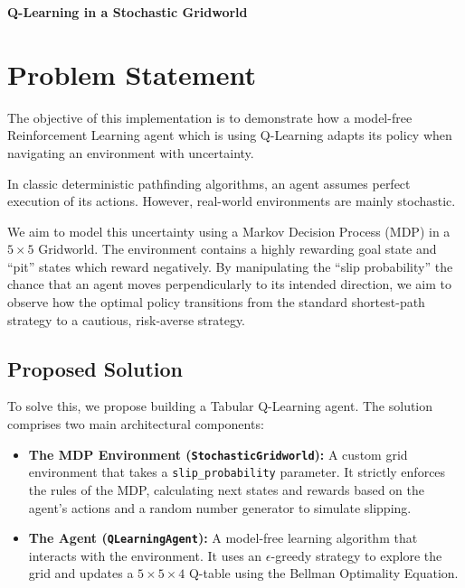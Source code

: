 \begin{center}
    \Large\textbf{\textcolor{primary}{Q-Learning in a Stochastic Gridworld}}
\end{center}
\vspace{0.5cm}

\section{\textcolor{secondary}{Problem Statement}}
The objective of this implementation is to demonstrate how a model-free Reinforcement Learning agent which is using Q-Learning adapts its policy when navigating an environment with uncertainty.

In classic deterministic pathfinding algorithms, an agent assumes perfect execution of its actions. However, real-world environments are mainly stochastic.

We aim to model this uncertainty using a Markov Decision Process (MDP) in a $5 \times 5$ Gridworld. The environment contains a highly rewarding goal state and ``pit'' states which reward negatively. By manipulating the ``slip probability'' the chance that an agent moves perpendicularly to its intended direction, we aim to observe how the optimal policy transitions from the standard shortest-path strategy to a cautious, risk-averse strategy.

\vspace{0.5cm}
\subsection{\textcolor{secondary}{Proposed Solution}}
To solve this, we propose building a Tabular Q-Learning agent. The solution comprises two main architectural components:

\begin{itemize}
    \item \textbf{The MDP Environment (\texttt{StochasticGridworld}):} A custom grid environment that takes a \texttt{slip\_probability} parameter. It strictly enforces the rules of the MDP, calculating next states and rewards based on the agent's actions and a random number generator to simulate slipping.
    \item \textbf{The Agent (\texttt{QLearningAgent}):} A model-free learning algorithm that interacts with the environment. It uses an $\epsilon$-greedy strategy to explore the grid and updates a $5 \times 5 \times 4$ Q-table using the Bellman Optimality Equation.
\end{itemize}

